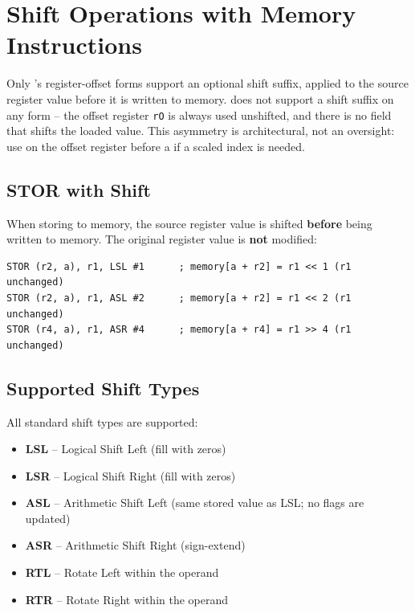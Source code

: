 \section{Shift Operations with Memory Instructions}
\label{sec:memory-shifts}

Only 's register-offset forms support an optional shift suffix, applied to the source register value
before it is written to memory.  does not support a shift suffix on any form -- the offset register
\texttt{rO} is always used unshifted, and there is no field that shifts the loaded value. This asymmetry is
architectural, not an oversight: use  on the offset register before a  if a scaled index
is needed.

\subsection{STOR with Shift}

When storing to memory, the source register value is shifted \textbf{before} being written to memory. The original
register value is \textbf{not} modified:

\begin{lstlisting}
STOR (r2, a), r1, LSL #1      ; memory[a + r2] = r1 << 1 (r1 unchanged)
STOR (r2, a), r1, ASL #2      ; memory[a + r2] = r1 << 2 (r1 unchanged)
STOR (r4, a), r1, ASR #4      ; memory[a + r4] = r1 >> 4 (r1 unchanged)
\end{lstlisting}

\subsection{Supported Shift Types}

All standard shift types are supported:
\begin{itemize}
	\item \textbf{LSL} -- Logical Shift Left (fill with zeros)
	\item \textbf{LSR} -- Logical Shift Right (fill with zeros)
	\item \textbf{ASL} -- Arithmetic Shift Left (same stored value as LSL; no flags are updated)
	\item \textbf{ASR} -- Arithmetic Shift Right (sign-extend)
	\item \textbf{RTL} -- Rotate Left within the operand
	\item \textbf{RTR} -- Rotate Right within the operand
\end{itemize}

